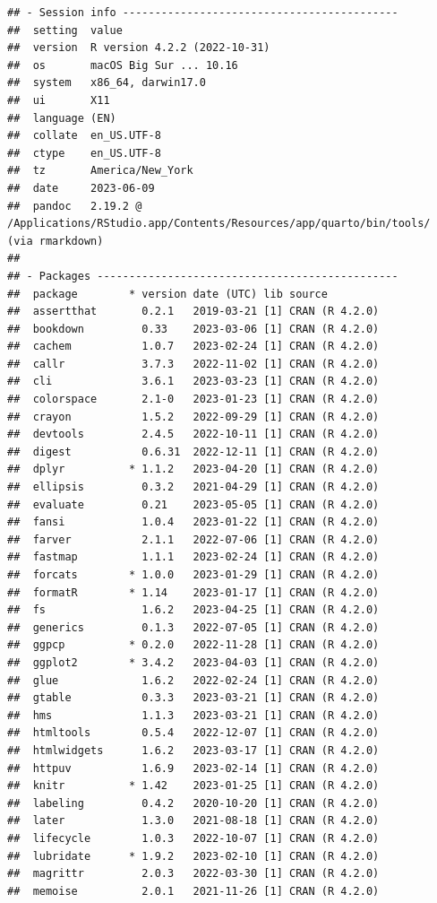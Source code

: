 \documentclass[print]{nuthesis}
\begin{document}
\begin{verbatim}
## - Session info -------------------------------------------
##  setting  value
##  version  R version 4.2.2 (2022-10-31)
##  os       macOS Big Sur ... 10.16
##  system   x86_64, darwin17.0
##  ui       X11
##  language (EN)
##  collate  en_US.UTF-8
##  ctype    en_US.UTF-8
##  tz       America/New_York
##  date     2023-06-09
##  pandoc   2.19.2 @ /Applications/RStudio.app/Contents/Resources/app/quarto/bin/tools/ (via rmarkdown)
## 
## - Packages -----------------------------------------------
##  package        * version date (UTC) lib source
##  assertthat       0.2.1   2019-03-21 [1] CRAN (R 4.2.0)
##  bookdown         0.33    2023-03-06 [1] CRAN (R 4.2.0)
##  cachem           1.0.7   2023-02-24 [1] CRAN (R 4.2.0)
##  callr            3.7.3   2022-11-02 [1] CRAN (R 4.2.0)
##  cli              3.6.1   2023-03-23 [1] CRAN (R 4.2.0)
##  colorspace       2.1-0   2023-01-23 [1] CRAN (R 4.2.0)
##  crayon           1.5.2   2022-09-29 [1] CRAN (R 4.2.0)
##  devtools         2.4.5   2022-10-11 [1] CRAN (R 4.2.0)
##  digest           0.6.31  2022-12-11 [1] CRAN (R 4.2.0)
##  dplyr          * 1.1.2   2023-04-20 [1] CRAN (R 4.2.0)
##  ellipsis         0.3.2   2021-04-29 [1] CRAN (R 4.2.0)
##  evaluate         0.21    2023-05-05 [1] CRAN (R 4.2.0)
##  fansi            1.0.4   2023-01-22 [1] CRAN (R 4.2.0)
##  farver           2.1.1   2022-07-06 [1] CRAN (R 4.2.0)
##  fastmap          1.1.1   2023-02-24 [1] CRAN (R 4.2.0)
##  forcats        * 1.0.0   2023-01-29 [1] CRAN (R 4.2.0)
##  formatR        * 1.14    2023-01-17 [1] CRAN (R 4.2.0)
##  fs               1.6.2   2023-04-25 [1] CRAN (R 4.2.0)
##  generics         0.1.3   2022-07-05 [1] CRAN (R 4.2.0)
##  ggpcp          * 0.2.0   2022-11-28 [1] CRAN (R 4.2.0)
##  ggplot2        * 3.4.2   2023-04-03 [1] CRAN (R 4.2.0)
##  glue             1.6.2   2022-02-24 [1] CRAN (R 4.2.0)
##  gtable           0.3.3   2023-03-21 [1] CRAN (R 4.2.0)
##  hms              1.1.3   2023-03-21 [1] CRAN (R 4.2.0)
##  htmltools        0.5.4   2022-12-07 [1] CRAN (R 4.2.0)
##  htmlwidgets      1.6.2   2023-03-17 [1] CRAN (R 4.2.0)
##  httpuv           1.6.9   2023-02-14 [1] CRAN (R 4.2.0)
##  knitr          * 1.42    2023-01-25 [1] CRAN (R 4.2.0)
##  labeling         0.4.2   2020-10-20 [1] CRAN (R 4.2.0)
##  later            1.3.0   2021-08-18 [1] CRAN (R 4.2.0)
##  lifecycle        1.0.3   2022-10-07 [1] CRAN (R 4.2.0)
##  lubridate      * 1.9.2   2023-02-10 [1] CRAN (R 4.2.0)
##  magrittr         2.0.3   2022-03-30 [1] CRAN (R 4.2.0)
##  memoise          2.0.1   2021-11-26 [1] CRAN (R 4.2.0)

\end{verbatim}
\end{document}
